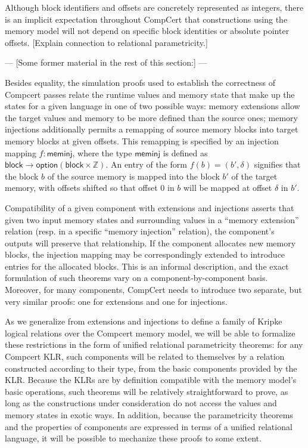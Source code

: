 \documentclass[acmsmall,timestamp,review]{acmart}
\newcommand{\kw}[1]{\ensuremath{ \mathsf{#1} }}
\begin{document}
Although block identifiers and offsets
are concretely represented as integers,
there is an implicit expectation throughout CompCert
that constructions using the memory model
will not depend on specific block identities
or absolute pointer offsets.
[Explain connection to relational parametricity.]

{\color{gray} %
--- [Some former material in the rest of this section:] ---

Besides equality,
the simulation proofs used
to establish the correctness of Compcert passes
relate the runtime values and memory state
that make up the states for a given language
in one of two possible ways:
memory extensions
allow the target values and memory to be more defined
than the source ones;
memory injections
additionally permits a remapping of source memory blocks
into target memory blocks at given offsets.
This remapping is specified by an injection mapping
$f : \kw{meminj}$,
where the type $\kw{meminj}$ is defined as
$\kw{block} \rightarrow \kw{option}(\kw{block} \times \mathbb{Z})$.
An entry of the form $f(b) = (b', \delta)$
signifies that the block $b$ of the source memory
is mapped into the block $b'$ of the target memory,
with offsets shifted so that
offset $0$ in $b$ will be mapped at offset $\delta$ in $b'$.

Compatibility of a given component
with extensions and injections
asserts that given two input memory states and surrounding values
in a ``memory extension'' relation
(resp. in a specific ``memory injection'' relation),
the component's outputs will preserve that relationship.
If the component allocates new memory blocks,
the injection mapping may be correspondingly extended
to introduce entries for the allocated blocks.
This is an informal description,
and the exact formulation of such theorems
vary on a component-by-component basis.
Moreover,
for many components,
CompCert needs to introduce two separate,
but very similar proofs:
one for extensions and one for injections.

As we generalize from extensions and injections
to define a family of Kripke logical relations
over the Compcert memory model,
we will be able to formalize these restrictions
in the form of unified relational parametricity theorems:
for any Compcert KLR,
such components will be related to themselves
by a relation constructed according to their type,
from the basic components provided by the KLR.
Because the KLRs are by definition compatible
with the memory model's basic operations,
such theorems will be relatively straightforward to prove,
as long as the constructions under consideration
do not access the values and memory states in exotic ways.
In addition,
because the parametricity theorems
and the properties of components
are expressed in terms of a unified relational language,
it will be possible to mechanize these proofs
to some extent.

}
\end{document}
